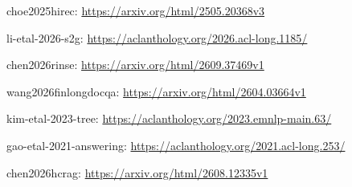 \documentclass[11pt]{article}
\begin{document}
choe2025hirec: \url{https://arxiv.org/html/2505.20368v3}


li-etal-2026-s2g: \url{https://aclanthology.org/2026.acl-long.1185/}


chen2026rinse: \url{https://arxiv.org/html/2609.37469v1}


wang2026finlongdocqa: \url{https://arxiv.org/html/2604.03664v1}


kim-etal-2023-tree: \url{https://aclanthology.org/2023.emnlp-main.63/}


gao-etal-2021-answering: \url{https://aclanthology.org/2021.acl-long.253/}


chen2026hcrag: \url{https://arxiv.org/html/2608.12335v1}
\end{document}
